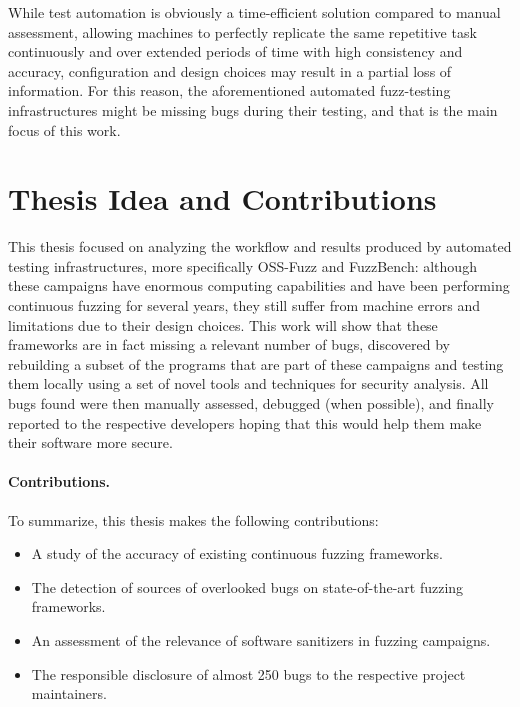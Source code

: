 While test automation is obviously a time-efficient solution compared to manual assessment, allowing machines to perfectly replicate the same repetitive task continuously and over extended periods of time with high consistency and accuracy, configuration and design choices may result in a partial loss of information. For this reason, the aforementioned automated fuzz-testing infrastructures might be missing bugs during their testing, and that is the main focus of this work.  




\section{Thesis Idea and Contributions}
This thesis focused on analyzing the workflow and results produced by automated testing infrastructures, more specifically OSS-Fuzz and FuzzBench: although these campaigns have enormous computing capabilities and have been performing continuous fuzzing for several years, they still suffer from machine errors and limitations due to their design choices. This work will show that these frameworks are in fact missing a relevant number of bugs, discovered by rebuilding a subset of the programs that are part of these campaigns and testing them locally using a set of novel tools and techniques for security analysis. All bugs found were then manually assessed, debugged (when possible), and finally reported to the respective developers hoping that this would help them make their software more secure.


\paragraph{Contributions.}
To summarize, this thesis makes the following contributions:
\begin{itemize}
    \item A study of the accuracy of existing continuous fuzzing frameworks.
    \item The detection of sources of overlooked bugs on state-of-the-art fuzzing frameworks.
    \item An assessment of the relevance of software sanitizers in fuzzing campaigns.
    \item The responsible disclosure of almost 250 bugs to the respective project maintainers.
\end{itemize}





